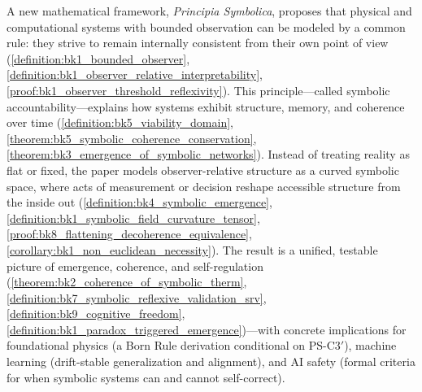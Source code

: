 A new mathematical framework, \emph{Principia Symbolica}, proposes that physical and computational systems with bounded observation can be modeled by a common rule: they strive to remain internally consistent from their own point of view (\ref{definition:bk1_bounded_observer}, \ref{definition:bk1_observer_relative_interpretability}, \ref{proof:bk1_observer_threshold_reflexivity}). This principle—called symbolic accountability—explains how systems exhibit structure, memory, and coherence over time (\ref{definition:bk5_viability_domain}, \ref{theorem:bk5_symbolic_coherence_conservation}, \ref{theorem:bk3_emergence_of_symbolic_networks}). Instead of treating reality as flat or fixed, the paper models observer-relative structure as a curved symbolic space, where acts of measurement or decision reshape accessible structure from the inside out (\ref{definition:bk4_symbolic_emergence}, \ref{definition:bk1_symbolic_field_curvature_tensor}, \ref{proof:bk8_flattening_decoherence_equivalence}, \ref{corollary:bk1_non_euclidean_necessity}). The result is a unified, testable picture of emergence, coherence, and self-regulation (\ref{theorem:bk2_coherence_of_symbolic_therm}, \ref{definition:bk7_symbolic_reflexive_validation_srv}, \ref{definition:bk9_cognitive_freedom}, \ref{definition:bk1_paradox_triggered_emergence})—with concrete implications for foundational physics (a Born Rule derivation conditional on PS-C3$'$), machine learning (drift-stable generalization and alignment), and AI safety (formal criteria for when symbolic systems can and cannot self-correct).

